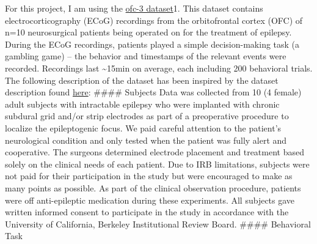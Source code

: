 \documentclass[11pt]{article}
\begin{document}
    For this project, I am using the
\href{http://crcns.org/data-sets/ofc/ofc-3/about-ofc-2}{ofc-3 dataset}1.
This dataset contains electrocorticography (ECoG) recordings from the
orbitofrontal cortex (OFC) of n=10 neurosurgical patients being operated
on for the treatment of epilepsy. During the ECoG recordings, patients
played a simple decision-making task (a gambling game) -- the behavior
and timestamps of the relevant events were recorded. Recordings last
\textasciitilde{}15min on average, each including 200 behavioral trials.
The following description of the dataset has been inspired by the
dataset description found
\href{http://crcns.org/files/data/ofc-3/crcns_ofc-3_data_description.pdf}{here}:
\#\#\#\# Subjects Data was collected from 10 (4 female) adult subjects
with intractable epilepsy who were implanted with chronic subdural grid
and/or strip electrodes as part of a preoperative procedure to localize
the epileptogenic focus. We paid careful attention to the patient's
neurological condition and only tested when the patient was fully alert
and cooperative. The surgeons determined electrode placement and
treatment based solely on the clinical needs of each patient. Due to IRB
limitations, subjects were not paid for their participation in the study
but were encouraged to make as many points as possible. As part of the
clinical observation procedure, patients were off anti-epileptic
medication during these experiments. All subjects gave written informed
consent to participate in the study in accordance with the University of
California, Berkeley Institutional Review Board. \#\#\#\# Behavioral
Task
\end{document}
